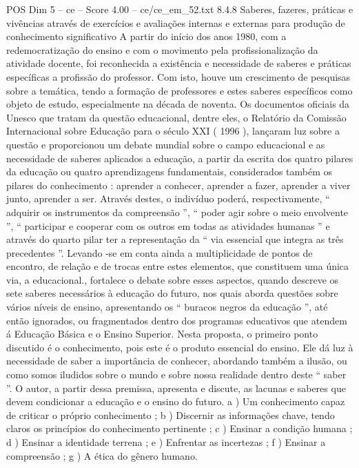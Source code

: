 \begin{textsample}{POS Dim 5 – ce – Score 4.00 – ce/ce\_em\_52.txt}  \label{ex:f5_pos_258}
8.4.8 Saberes, fazeres, práticas e vivências através de exercícios e avaliações internas e externas para produção de conhecimento significativo A partir do início dos anos 1980, com a redemocratização do ensino e com o movimento pela profissionalização da atividade docente, foi reconhecida a existência e necessidade de saberes e práticas específicas a profissão do professor.
Com isto, houve um crescimento de pesquisas sobre a temática, tendo a formação de professores e estes saberes específicos como objeto de estudo, especialmente na década de noventa.
Os documentos oficiais da Unesco que tratam da questão educacional, dentre eles, o Relatório da Comissão Internacional sobre Educação para o século XXI ( 1996 ), lançaram luz sobre a questão e proporcionou um debate mundial sobre o campo educacional e as necessidade de saberes aplicados a educação, a partir da escrita dos quatro pilares da educação ou quatro aprendizagens fundamentais, considerados também os pilares do conhecimento : aprender a conhecer, aprender a fazer, aprender a viver junto, aprender a ser.
Através destes, o indivíduo poderá, respectivamente, “ adquirir os instrumentos da compreensão ”, “ poder agir sobre o meio envolvente ”, “ participar e cooperar com os outros em todas as atividades humanas ” e através do quarto pilar ter a representação da “ via essencial que integra as três precedentes ”.
Levando -se em conta ainda a multiplicidade de pontos de encontro, de relação e de trocas entre estes elementos, que constituem uma única via, a educacional., fortalece o debate sobre esses aspectos, quando descreve os sete saberes necessários à educação do futuro, nos quais aborda questões sobre vários níveis de ensino, apresentando os “ buracos negros da educação ”, até então ignorados, ou fragmentados dentro dos programas educativos que atendem á Educação Básica e o Ensino Superior.
Nesta proposta, o primeiro ponto discutido é o conhecimento, pois este é o produto essencial do ensino.
Ele dá luz à necessidade de saber a importância de conhecer, abordando também a ilusão, ou como somos iludidos sobre o mundo e sobre nossa realidade dentro deste “ saber ”.
O autor, a partir dessa premissa, apresenta e discute, as lacunas e saberes que devem condicionar a educação e o ensino do futuro. a ) Um conhecimento capaz de criticar o próprio conhecimento ; b ) Discernir as informações chave, tendo claros os princípios do conhecimento pertinente ; c ) Ensinar a condição humana ; d ) Ensinar a identidade terrena ; e ) Enfrentar as incertezas ; f ) Ensinar a compreensão ; g ) A ética do gênero humano.

\end{textsample}
